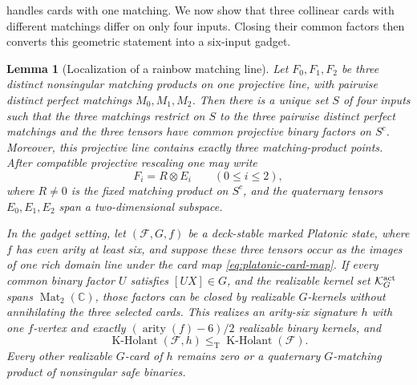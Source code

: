 \documentclass[11pt,letterpaper,onecolumn]{article}
\theoremstyle{plain}
\newtheorem{lemma}[lemma]{Lemma}
\theoremstyle{definition}
\theoremstyle{remark}
\newcommand{\cF}{\mathcal F}
\newcommand{\KHolant}{\operatorname{K\text{-}Holant}}
\newcommand{\Mat}{\operatorname{Mat}}
\newcommand{\arity}{\operatorname{arity}}
\newcommand{\leT}{\leq_{\mathrm T}}
\begin{document}
 handles cards with one matching. We now
show that three collinear cards with different matchings differ on only
four inputs. Closing their common factors then converts this geometric
statement into a six-input gadget.
\begin{lemma}[Localization of a rainbow matching line]
\label{lem:platonic-rainbow-localization}
Let \(F_0,F_1,F_2\) be three distinct nonsingular matching products on one
projective line, with pairwise distinct perfect matchings \(M_0,M_1,M_2\).
Then there is a unique set \(S\) of four inputs such
that the three matchings restrict on \(S\) to the three pairwise distinct
perfect matchings and the three tensors have common projective binary
factors on \(S^c\).  Moreover, this projective line contains exactly three
matching-product points.  After compatible projective rescaling one may
write
\[
 F_i=R\otimes E_i\qquad(0\le i\le2),
\]
where \(R\ne0\) is the fixed matching product on \(S^c\), and the
quaternary tensors \(E_0,E_1,E_2\) span a two-dimensional subspace.

In the gadget setting, let \((\cF,G,f)\) be a deck-stable marked
Platonic state, where \(f\) has even arity at least six,
and suppose these three tensors occur as the images of one rich domain line
under the card map
\cref{eq:platonic-card-map}.  If every common binary factor \(U\) satisfies
\([UX]\in G\), and the realizable kernel set
\(\mathcal K_G^{\rm act}\) spans
\(\Mat_2(\mathbb C)\), those factors can be closed by realizable
\(G\)-kernels without annihilating the three selected cards.  This realizes
an arity-six signature \(h\) with one \(f\)-vertex and exactly
\((\arity(f)-6)/2\) realizable binary kernels, and
\begin{equation}
  \KHolant(\cF,h)
  \leT
  \KHolant(\cF).
  \label{eq:platonic-localization-reduction}
\end{equation}
Every other realizable \(G\)-card of \(h\) remains zero or a quaternary \(G\)-matching product of nonsingular safe binaries.
\end{lemma}
\end{document}
